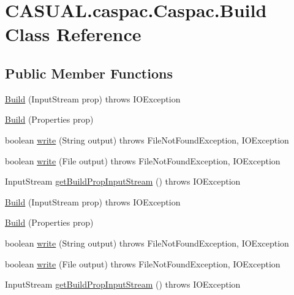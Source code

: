 \hypertarget{class_c_a_s_u_a_l_1_1caspac_1_1_caspac_1_1_build}{\section{C\-A\-S\-U\-A\-L.\-caspac.\-Caspac.\-Build Class Reference}
\label{class_c_a_s_u_a_l_1_1caspac_1_1_caspac_1_1_build}
}
\subsection*{Public Member Functions}
\begin{DoxyCompactItemize}
\item 
\hyperlink{class_c_a_s_u_a_l_1_1caspac_1_1_caspac_1_1_build_a10be80f79917bde176b2adfc86cac412}{Build} (Input\-Stream prop)  throws I\-O\-Exception 
\item 
\hyperlink{class_c_a_s_u_a_l_1_1caspac_1_1_caspac_1_1_build_a08e2bee2ba8eeb91e8f6ce29b6adca65}{Build} (Properties prop)
\item 
boolean \hyperlink{class_c_a_s_u_a_l_1_1caspac_1_1_caspac_1_1_build_a20fe31e79339dd62322455b84562ca34}{write} (String output)  throws File\-Not\-Found\-Exception, I\-O\-Exception 
\item 
boolean \hyperlink{class_c_a_s_u_a_l_1_1caspac_1_1_caspac_1_1_build_a6716fc08f8781e8887c5d30b8bebe10a}{write} (File output)  throws File\-Not\-Found\-Exception, I\-O\-Exception 
\item 
Input\-Stream \hyperlink{class_c_a_s_u_a_l_1_1caspac_1_1_caspac_1_1_build_a19c3b39c50785f03993b9eda141060c8}{get\-Build\-Prop\-Input\-Stream} ()  throws I\-O\-Exception 
\item 
\hyperlink{class_c_a_s_u_a_l_1_1caspac_1_1_caspac_1_1_build_a10be80f79917bde176b2adfc86cac412}{Build} (Input\-Stream prop)  throws I\-O\-Exception 
\item 
\hyperlink{class_c_a_s_u_a_l_1_1caspac_1_1_caspac_1_1_build_a08e2bee2ba8eeb91e8f6ce29b6adca65}{Build} (Properties prop)
\item 
boolean \hyperlink{class_c_a_s_u_a_l_1_1caspac_1_1_caspac_1_1_build_a20fe31e79339dd62322455b84562ca34}{write} (String output)  throws File\-Not\-Found\-Exception, I\-O\-Exception 
\item 
boolean \hyperlink{class_c_a_s_u_a_l_1_1caspac_1_1_caspac_1_1_build_a6716fc08f8781e8887c5d30b8bebe10a}{write} (File output)  throws File\-Not\-Found\-Exception, I\-O\-Exception 
\item 
Input\-Stream \hyperlink{class_c_a_s_u_a_l_1_1caspac_1_1_caspac_1_1_build_a19c3b39c50785f03993b9eda141060c8}{get\-Build\-Prop\-Input\-Stream} ()  throws I\-O\-Exception 
\end{DoxyCompactItemize}
